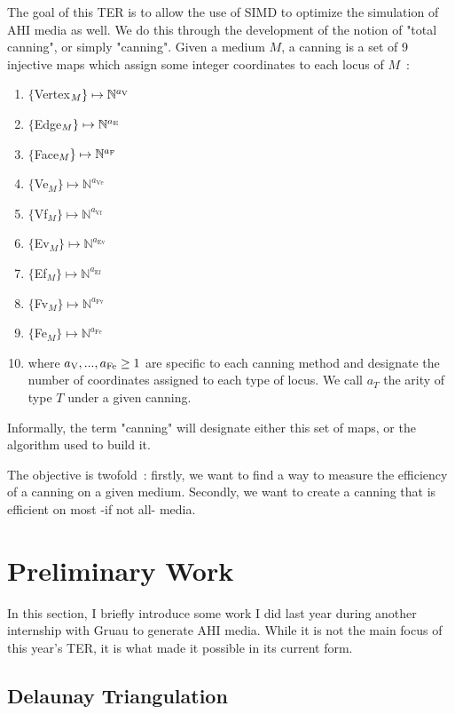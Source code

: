 \documentclass{article}
\begin{document}
The goal of this TER is to allow the use of SIMD to optimize the simulation of AHI media as well. We do this through the development of the notion of "total canning", or simply "canning". Given a medium $M$, a canning is a set of 9 injective maps which assign some integer coordinates to each locus of $M$~:
\begin{enumerate}
	\item $\{$Vertex$_M\} \mapsto \mathbb{N}^{a_\text V}$
	\item $\{$Edge$_M\} \mapsto \mathbb{N}^{a_\text E}$
	\item $\{$Face$_M\} \mapsto \mathbb{N}^{a_\text F}$
	\item $\{$Ve$_M\} \mapsto \mathbb{N}^{a_\text{Ve}}$
	\item $\{$Vf$_M\} \mapsto \mathbb{N}^{a_\text{Vf}}$
	\item $\{$Ev$_M\} \mapsto \mathbb{N}^{a_\text{Ev}}$
	\item $\{$Ef$_M\} \mapsto \mathbb{N}^{a_\text{Ef}}$
	\item $\{$Fv$_M\} \mapsto \mathbb{N}^{a_\text{Fv}}$
	\item $\{$Fe$_M\} \mapsto \mathbb{N}^{a_\text{Fe}}$
	\item[] where $a_\text V, ..., a_\text{Fe} \geq 1$ are specific to each canning method and designate the number of coordinates assigned to each type of locus. We call $a_T$ the arity of type $T$ under a given canning.
\end{enumerate}
Informally, the term "canning" will designate either this set of maps, or the algorithm used to build it.

The objective is twofold~: firstly, we want to find a way to measure the efficiency of a canning on a given medium. Secondly, we want to create a canning that is efficient on most -if not all- media.

\section{Preliminary Work}

In this section, I briefly introduce some work I did last year during another internship with Gruau to generate AHI media. While it is not the main focus of this year's TER, it is what made it possible in its current form.

\subsection{Delaunay Triangulation}
\end{document}

